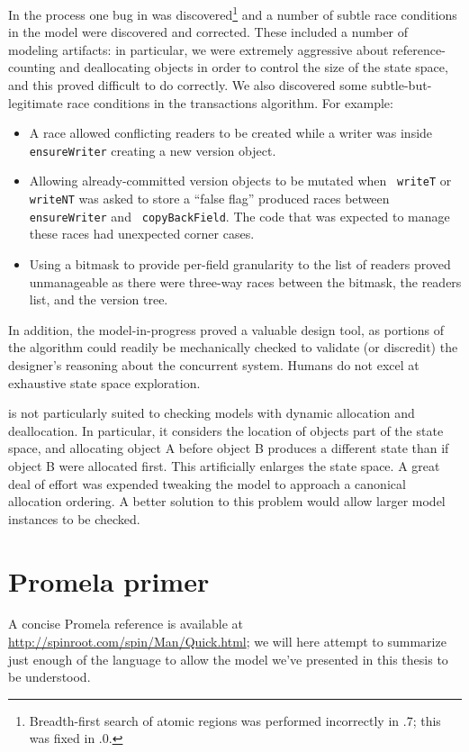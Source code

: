 In the process one bug in \Spin was discovered\footnote{Breadth-first
search of atomic regions was performed incorrectly in .7;
this was fixed in .0.}
and a number of subtle race conditions in the model were discovered and
corrected.  These included a number of modeling artifacts: in
particular, we were extremely aggressive about reference-counting and
deallocating objects in order to control the size of the state space,
and this proved difficult to do correctly.  We also discovered some
subtle-but-legitimate race conditions in the transactions algorithm.
For example:
\begin{itemize}
\item A race allowed conflicting readers to be created while a writer
  was inside {\tt ensureWriter} creating a new version object.
\item Allowing already-committed version objects to be mutated when {\tt
    writeT} or {\tt writeNT} was asked to store a ``false flag'' produced
  races between {\tt ensureWriter} and {\tt
    copyBackField}.  The code that was expected to manage these races
  had unexpected corner cases.
\item Using a bitmask to provide per-field granularity
  to the list of readers proved unmanageable as there were three-way
  races between the bitmask, the readers list, and the version tree.
\end{itemize}
In addition, the model-in-progress proved a valuable design tool, as
portions of the algorithm could readily be mechanically checked to
validate (or discredit) the designer's reasoning about the concurrent
system.  Humans do not excel at exhaustive state space exploration.

\Spin is not particularly suited to checking models with dynamic
allocation and deallocation.  In particular, it considers the
location of objects part of the state space, and allocating object
A before object B produces a different state than if object B
were allocated first.  This artificially enlarges the
state space.  A great deal of effort was expended tweaking the
model to approach a canonical allocation ordering.  A better solution
to this problem would allow larger model instances to be checked.


\section{Promela primer}\label{sec:promela}
A concise Promela reference is available at
\url{http://spinroot.com/spin/Man/Quick.html}; we will here attempt to
summarize just enough of the language to allow the model we've
presented in this thesis to be understood.

